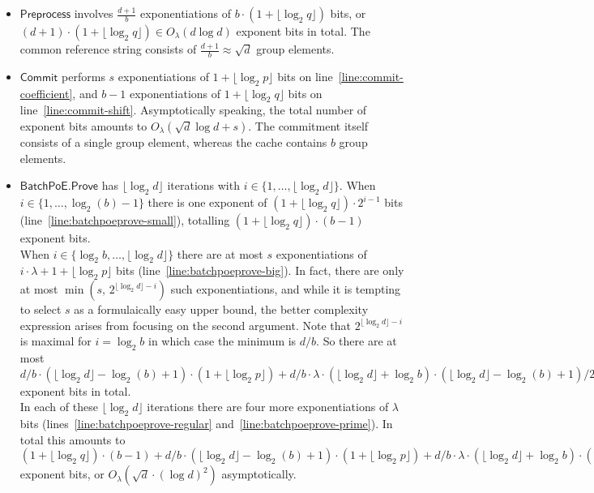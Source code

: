 \documentclass{article}
\theoremstyle{Definition}
\begin{document}
\begin{itemize}
\item $\mathsf{Preprocess}$ involves $\frac{d+1}{b}$ exponentiations of $b \cdot (1 + \lfloor \log_2 q \rfloor)$ bits, or $(d+1) \cdot (1 + \lfloor \log_2 q \rfloor) \in O_\lambda(d \log d)$ exponent bits in total. The common reference string consists of $\frac{d+1}{b}\approx\sqrt{d}$ group elements.
\item $\mathsf{Commit}$ performs $s$ exponentiations of $1+\lfloor \log_2 p \rfloor$ bits on line~\ref{line:commit-coefficient}, and $b-1$ exponentiations of $1+\lfloor \log_2 q \rfloor$ bits on line~\ref{line:commit-shift}. Asymptotically speaking, the total number of exponent bits amounts to $O_\lambda(\sqrt{d} \log d + s)$. The commitment itself consists of a single group element, whereas the cache contains $b$ group elements.
\item $\mathsf{BatchPoE.Prove}$ has $\lfloor \log_2 d \rfloor$ iterations with $i \in \{1, \ldots, \lfloor \log_2 d \rfloor\}$. When $i \in \{1, \ldots, \log_2(b)-1\}$ there is one exponent of $(1 + \lfloor \log_2 q \rfloor) \cdot {2^{i-1}}$ bits (line~\ref{line:batchpoeprove-small}), totalling $(1+\lfloor \log_2 q \rfloor) \cdot (b-1)$ exponent bits. \\
When $i \in \{\log_2 b, \ldots, \lfloor \log_2 d \rfloor\}$ there are at most $s$ exponentiations of $i \cdot \lambda + 1 + \lfloor \log_2 p \rfloor$ bits (line~\ref{line:batchpoeprove-big}). In fact, there are only at most $\min(s, \, 2^{\lfloor \log_2 d \rfloor - i})$ such exponentiations, and while it is tempting to select $s$ as a formulaically easy upper bound, the better complexity expression arises from focusing on the second argument. Note that $2^{\lfloor \log_2 d \rfloor - i}$ is maximal for $i = \log_2 b$ in which case the minimum is $d/b$. So there are at most $d/b \cdot (\lfloor \log_2 d \rfloor - \log_2(b) + 1) \cdot (1 + \lfloor \log_2 p \rfloor) + d/b \cdot \lambda \cdot (\lfloor \log_2 d \rfloor + \log_2 b) \cdot (\lfloor \log_2 d \rfloor - \log_2(b) + 1)/2$ exponent bits in total. \\
In each of these $\lfloor \log_2 d \rfloor$ iterations there are four more exponentiations of $\lambda$ bits (lines~\ref{line:batchpoeprove-regular} and~\ref{line:batchpoeprove-prime}). In total this amounts to $(1+\lfloor \log_2 q \rfloor) \cdot (b-1)  +  d/b \cdot (\lfloor \log_2 d \rfloor - \log_2(b) + 1) \cdot (1 + \lfloor \log_2 p \rfloor) + d/b \cdot \lambda \cdot (\lfloor \log_2 d \rfloor + \log_2 b) \cdot (\lfloor \log_2 d \rfloor - \log_2(b) + 1)/2  +  4 \cdot \lambda \cdot \lfloor \log_2 d \rfloor$ exponent bits, or $O_\lambda(\sqrt{d} \cdot (\log d)^2)$ asymptotically.

\end{itemize}
\end{document}
